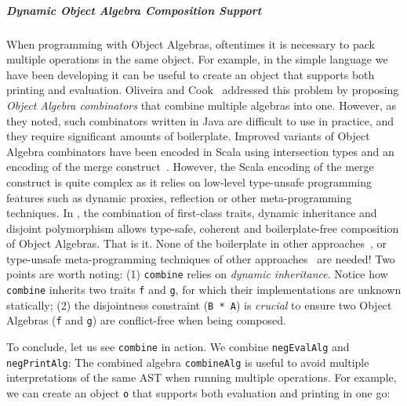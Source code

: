 


\subparagraph{Dynamic Object Algebra Composition Support}

When programming with Object Algebras, oftentimes it is necessary to pack
multiple operations in the same object. For example, in the simple language we
have been developing it can be useful to create an object that supports both
printing and evaluation. Oliveira and Cook~\cite{oliveira2012extensibility}
addressed this problem by proposing \emph{Object Algebra combinators} that
combine multiple algebras into one. However, as they noted, such combinators
written in Java are difficult to use in practice, and they require significant
amounts of boilerplate. Improved variants of Object Algebra combinators have
been encoded in Scala using intersection types and an encoding of the merge
construct~\cite{oliveira2013feature, rendel14attributes}. However, the
Scala encoding of the merge construct is quite complex as it relies on low-level
type-unsafe programming features such as dynamic proxies, reflection or other
meta-programming techniques. In \name, the combination of first-class
traits, dynamic inheritance and disjoint polymorphism allows type-safe, coherent
and boilerplate-free composition of Object Algebras.
That is it. None of the boilerplate in other
approaches~\cite{oliveira2012extensibility}, or type-unsafe meta-programming
techniques of other approaches~\cite{oliveira2013feature,rendel14attributes} are
needed! Two points are worth noting: (1) \lstinline{combine} relies on
\emph{dynamic inheritance}. Notice how \lstinline{combine} inherits two traits
\lstinline{f} and \lstinline{g}, for which their implementations are unknown
statically; (2) the disjointness constraint (\lstinline{B * A}) is \emph{crucial} to
ensure two Object Algebras (\lstinline{f} and \lstinline{g}) are conflict-free
when being composed.

To conclude, let us see \lstinline{combine} in action. We combine \lstinline{negEvalAlg} and \lstinline{negPrintAlg}:
The combined algebra \lstinline{combineAlg} is useful to avoid multiple interpretations
of the same AST when running multiple operations. For example, we can
create an object \lstinline{o} that supports both evaluation and printing in one go:


